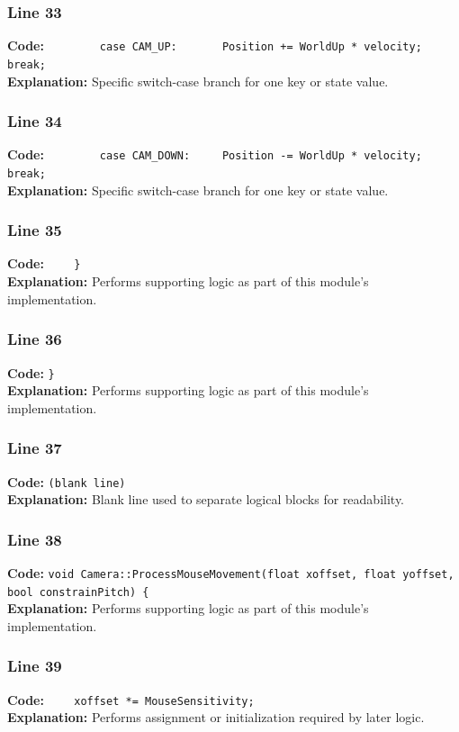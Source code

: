 \documentclass[11pt,a4paper]{article}
\begin{document}
\subsubsection*{Line 33}
\textbf{Code:} \verb|        case CAM_UP:       Position += WorldUp * velocity; break;|\\
\textbf{Explanation:} Specific switch-case branch for one key or state value.

\subsubsection*{Line 34}
\textbf{Code:} \verb|        case CAM_DOWN:     Position -= WorldUp * velocity; break;|\\
\textbf{Explanation:} Specific switch-case branch for one key or state value.

\subsubsection*{Line 35}
\textbf{Code:} \verb|    }|\\
\textbf{Explanation:} Performs supporting logic as part of this module's implementation.

\subsubsection*{Line 36}
\textbf{Code:} \verb|}|\\
\textbf{Explanation:} Performs supporting logic as part of this module's implementation.

\subsubsection*{Line 37}
\textbf{Code:} \texttt{(blank line)}\\
\textbf{Explanation:} Blank line used to separate logical blocks for readability.

\subsubsection*{Line 38}
\textbf{Code:} \verb|void Camera::ProcessMouseMovement(float xoffset, float yoffset, bool constrainPitch) {|\\
\textbf{Explanation:} Performs supporting logic as part of this module's implementation.

\subsubsection*{Line 39}
\textbf{Code:} \verb|    xoffset *= MouseSensitivity;|\\
\textbf{Explanation:} Performs assignment or initialization required by later logic.
\end{document}
